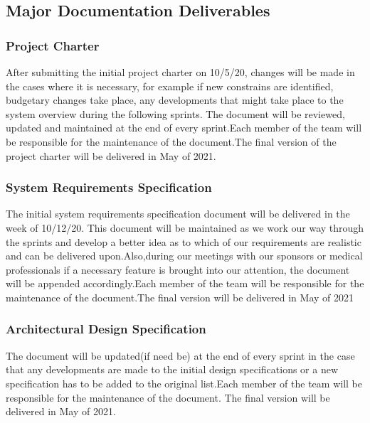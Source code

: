 
\subsection{Major Documentation Deliverables}

\subsubsection{Project Charter}

After submitting the initial project charter on 10/5/20, changes will be made in the cases where it is necessary, for example if new constrains are identified, budgetary changes take place, any developments that might take place to the system overview during the following sprints. The document will be reviewed, updated and maintained at the end of every sprint.Each member of the team will be responsible for the maintenance of the document.The final version of the project charter will be delivered in May of 2021.

\subsubsection{System Requirements Specification}

The initial system requirements specification document will be delivered in the week of 10/12/20. This document will be maintained as we work our way through the sprints and develop a better idea as to which of our requirements are realistic and can be delivered upon.Also,during our meetings with our sponsors or medical professionals if a necessary feature is brought into our attention, the document will be appended accordingly.Each member of the team will be responsible for the maintenance of the document.The final version will be delivered in May of 2021

\subsubsection{Architectural Design Specification}
The document will be updated(if need be) at the end of every sprint in the case that any developments are made to the initial design specifications or a new specification has to be added to the original list.Each member of the team will be responsible for the maintenance of the document. The final version will be delivered in May of 2021.

